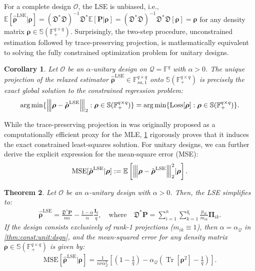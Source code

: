 \documentclass[noinfoline]{imsart}\setcounter{tocdepth}{2}
\renewcommand{\b}[1]{\mathbb{#1}} %
\newcommand{\m}[1]{\mathbf{#1}} %
\newcommand{\s}[1]{\mathscr{#1}} %
\newcommand{\f}[1]{\mathfrak{#1}} %
\renewcommand{\c}[1]{\mathcal{#1}} %
\newcommand{\mb}[1]{\boldsymbol{#1}} %
\newcommand{\tr}[1]{\operatorname{Tr}\left[#1\right]}
\newcommand{\vertiii}[1]{{\left\vert\kern-0.25ex\left\vert\kern-0.25ex\left\vert #1 
    \right\vert\kern-0.25ex\right\vert\kern-0.25ex\right\vert}} %
\DeclareMathOperator*{\argmin}{\arg\min}
\theoremstyle{plain}
\newtheorem{theorem}{Theorem}[section]
\newtheorem{corollary}[theorem]{Corollary}
\begin{document}
For a complete design $\s{O}$, the LSE is unbiased, i.e., $\b{E}[\hat{\mb{\rho}}^{\text{LSE}} \vert \mb{\rho}] = (\f{D}^{*} \f{D})^{-1} \f{D}^{*} \b{E}[\m{P} \vert \mb{\rho}] = (\f{D}^{*} \f{D})^{-1} \f{D}^{*} \f{D} [\mb{\rho}] = \mb{\rho}$ for any density matrix $\mb{\rho} \in \b{S}(\b{F}_{+}^{q \times q})$.
Surprisingly, the two-step procedure, unconstrained estimation followed by trace-preserving projection, is mathematically equivalent to solving the fully constrained optimization problem for unitary designs.

\begin{corollary}\label{cor:equiv:proj}
Let $\s{O}$ be an $\alpha$-unitary design on $\c{Q} = \b{F}^{q}$ with $\alpha > 0$. The unique projection of the relaxed estimator $\hat{\mb{\rho}}^{\text{LSE}} \in \b{F}_{sa, 1}^{q \times q}$ onto $\b{S}(\b{F}_{+}^{q \times q})$ is precisely the exact global solution to the constrained regression problem:
\begin{align*}
    \argmin \{\vertiii{\mb{\rho} - \hat{\mb{\rho}}^{\text{LSE}}}_{2} : \mb{\rho} \in \b{S}(\b{F}_{+}^{q \times q})\} = 
    \argmin \{\mathrm{Loss}[\mb{\rho}] : \mb{\rho} \in \b{S}(\b{F}_{+}^{q \times q})\}.
\end{align*}
\end{corollary}



While the trace-preserving projection in \cite{smolin2012efficient} was originally proposed as a computationally efficient proxy for the MLE, \cref{cor:equiv:proj} rigorously proves that it induces the exact constrained least-squares solution. For unitary designs, we can further derive the explicit expression for the mean-square error (MSE):
\begin{align*}
    \mathrm{MSE}[\hat{\mb{\rho}}^{\text{LSE}} \vert \mb{\rho}] := \b{E} \left[\vertiii{\mb{\rho} - \hat{\mb{\rho}}^{\text{LSE}}}_{2}^{2} \vert \mb{\rho} \right].
\end{align*}

\begin{theorem}\label{cor:unit:mse}
Let $\s{O}$ be an $\alpha$-unitary design with $\alpha > 0$. Then, the LSE simplifies to:
\begin{align}\label{eq:unit:des:LSE}
    \hat{\mb{\rho}}^{\text{LSE}} = \frac{\f{D}^{*} \m{P}}{n \alpha} - \frac{1-\alpha}{\alpha} \frac{\m{I}_{q}}{q}, \quad \text{where} \quad \f{D}^{*} \m{P} = \sum_{i=1}^{n} \sum_{k=1}^{q_{i}} \frac{p_{ik}}{m_{ik}} \m{\Pi}_{ik}.
\end{align}
If the design consists exclusively of rank-1 projections ($m_{ik} \equiv 1$), then $\alpha = \alpha_{\c{Q}}$ in \cref{thm:const:unit:dsgn}, and the mean-squared error for any density matrix $\mb{\rho} \in \b{S}(\b{F}_{+}^{q \times q})$ is given by:
\begin{align*}
    \mathrm{MSE}[\hat{\mb{\rho}}^{\text{LSE}} \vert \mb{\rho}] = \frac{1}{n r \alpha_{\c{Q}}^{2}} \left[ \left(1 - \frac{1}{q} \right) -  \alpha_{\c{Q}} \left(\tr{\mb{\rho}^{2}} - \frac{1}{q} \right) \right].
\end{align*}
\end{theorem}
\end{document}
